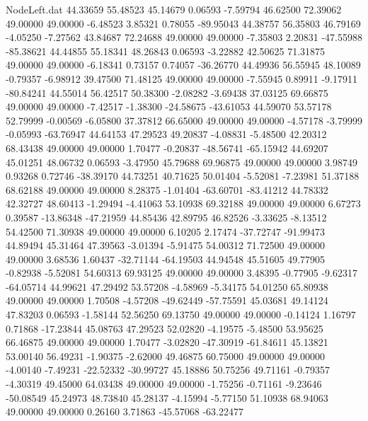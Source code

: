 \begin{filecontents}{NodeLeft.dat}
  44.33659   55.48523   45.14679     0.06593   -7.59794   46.62500   72.39062   49.00000   49.00000   -6.48523    3.85321    0.78055  -89.95043
  44.38757   56.35803   46.79169    -4.05250   -7.27562   43.84687   72.24688   49.00000   49.00000   -7.35803    2.20831  -47.55988  -85.38621
  44.44855   55.18341   48.26843     0.06593   -3.22882   42.50625   71.31875   49.00000   49.00000   -6.18341    0.73157    0.74057  -36.26770
  44.49936   56.55945   48.10089    -0.79357   -6.98912   39.47500   71.48125   49.00000   49.00000   -7.55945    0.89911   -9.17911  -80.84241
  44.55014   56.42517   50.38300    -2.08282   -3.69438   37.03125   69.66875   49.00000   49.00000   -7.42517   -1.38300  -24.58675  -43.61053
  44.59070   53.57178   52.79999    -0.00569   -6.05800   37.37812   66.65000   49.00000   49.00000   -4.57178   -3.79999   -0.05993  -63.76947
  44.64153   47.29523   49.20837    -4.08831   -5.48500   42.20312   68.43438   49.00000   49.00000    1.70477   -0.20837  -48.56741  -65.15942
  44.69207   45.01251   48.06732     0.06593   -3.47950   45.79688   69.96875   49.00000   49.00000    3.98749    0.93268    0.72746  -38.39170
  44.73251   40.71625   50.01404    -5.52081   -7.23981   51.37188   68.62188   49.00000   49.00000    8.28375   -1.01404  -63.60701  -83.41212
  44.78332   42.32727   48.60413    -1.29494   -4.41063   53.10938   69.32188   49.00000   49.00000    6.67273    0.39587  -13.86348  -47.21959
  44.85436   42.89795   46.82526    -3.33625   -8.13512   54.42500   71.30938   49.00000   49.00000    6.10205    2.17474  -37.72747  -91.99473
  44.89494   45.31464   47.39563    -3.01394   -5.91475   54.00312   71.72500   49.00000   49.00000    3.68536    1.60437  -32.71144  -64.19503
  44.94548   45.51605   49.77905    -0.82938   -5.52081   54.60313   69.93125   49.00000   49.00000    3.48395   -0.77905   -9.62317  -64.05714
  44.99621   47.29492   53.57208    -4.58969   -5.34175   54.01250   65.80938   49.00000   49.00000    1.70508   -4.57208  -49.62449  -57.75591
  45.03681   49.14124   47.83203     0.06593   -1.58144   52.56250   69.13750   49.00000   49.00000   -0.14124    1.16797    0.71868  -17.23844
  45.08763   47.29523   52.02820    -4.19575   -5.48500   53.95625   66.46875   49.00000   49.00000    1.70477   -3.02820  -47.30919  -61.84611
  45.13821   53.00140   56.49231    -1.90375   -2.62000   49.46875   60.75000   49.00000   49.00000   -4.00140   -7.49231  -22.52332  -30.99727
  45.18886   50.75256   49.71161    -0.79357   -4.30319   49.45000   64.03438   49.00000   49.00000   -1.75256   -0.71161   -9.23646  -50.08549
  45.24973   48.73840   45.28137    -4.15994   -5.77150   51.10938   68.94063   49.00000   49.00000    0.26160    3.71863  -45.57068  -63.22477

\end{filecontents}
